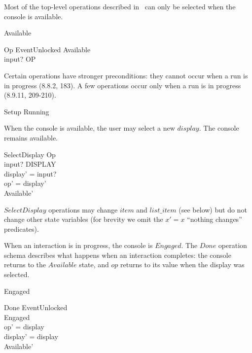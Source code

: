 \documentclass{article}
\begin{document}
Most of the top-level operations described in~\cite{jacky92}
can only be selected when the console is available.

\begin{zed} Available  \end{zed}

\begin{schema}{Op}
	EventUnlocked
\where
	Available \\
	input? \in OP \\
\end{schema}
Certain operations have stronger preconditions: they cannot occur when
a run is in progress (8.8.2, 183).  A few operations occur only when a
run is in progress (8.9.11, 209-210). 

\begin{zed}
	Setup 
\also
	Running 
\end{zed}
When the console is available, the user may select a new $display$.
The console remains available.

\begin{schema}{SelectDisplay}
	Op \\
\where
	input? \in DISPLAY \\
	display' = input?  \\
	op' = display' \\
	Available' \\
\end{schema}
$SelectDisplay$ operations may change $item$ and $list\_item$ (see
below) but do not change other state variables (for brevity we omit
the $x' = x$ ``nothing changes'' predicates).

When an interaction is in progress, the console is $Engaged$.
The $Done$ operation schema describes what happens when an interaction
completes: the console returns to the $Available$ state, and $op$
returns to its value when the display was selected.

\begin{zed} Engaged  \end{zed}

\begin{schema}{Done}
	EventUnlocked \\
\where
	Engaged \\
	op' = display \\
	display' = display \\
	Available'
\end{schema}
\end{document}
